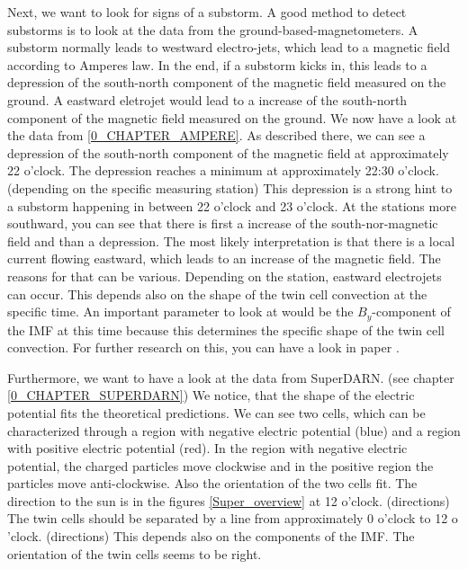 \documentclass[10pt,a4paper]{article}
\begin{document}
Next, we want to look for signs of a substorm. A good method to detect substorms is to look at the data from the ground-based-magnetometers. A substorm 
normally leads to westward electro-jets, which lead to a magnetic field according to Amperes law. In the end, if a substorm kicks in, this leads to a depression of the south-north component of the magnetic field measured on the ground. A eastward eletrojet would lead to a increase of the south-north component of the magnetic field measured on the ground. We now have a look at the data from \ref{0_CHAPTER_AMPERE}. As described there, we can see a depression of the south-north component of the magnetic field at approximately 22 o'clock. The depression reaches a minimum at approximately 22:30 o'clock. (depending on the specific measuring station) This depression is a strong hint to a substorm happening in between 22 o'clock and 23 o'clock. 
At the stations more southward, you can see that there is first a increase of the south-nor-magnetic field and than a depression. The most likely interpretation is that there is a local current flowing eastward, which leads to an increase of the magnetic field. The reasons for that can be various. Depending on the station, eastward electrojets can occur. This depends also on the shape of the twin cell convection at the specific time. An important parameter to look at would be the $B_y$-component of the IMF at this time because this determines the specific shape of the twin cell convection. For further research on this, you can have a look in paper \cite{paper2}.

Furthermore, we want to have a look at the data from SuperDARN. (see chapter \ref{0_CHAPTER_SUPERDARN}) We notice, that the shape of the electric potential fits the theoretical predictions. We can see two cells, which can be characterized through a region with negative electric potential (blue) and a region with positive electric potential (red). In the region with negative electric potential, the charged particles move clockwise and in the positive region the particles move anti-clockwise. 
Also the orientation of the two cells fit. The direction to the sun is in the figures \ref{Super_overview} at 12 o'clock. (directions)
The twin cells should be separated by a line from approximately  0 o'clock to 12 o 'clock. (directions) This depends also on the components of the IMF. The orientation of the twin cells seems to be right.  
\end{document}
